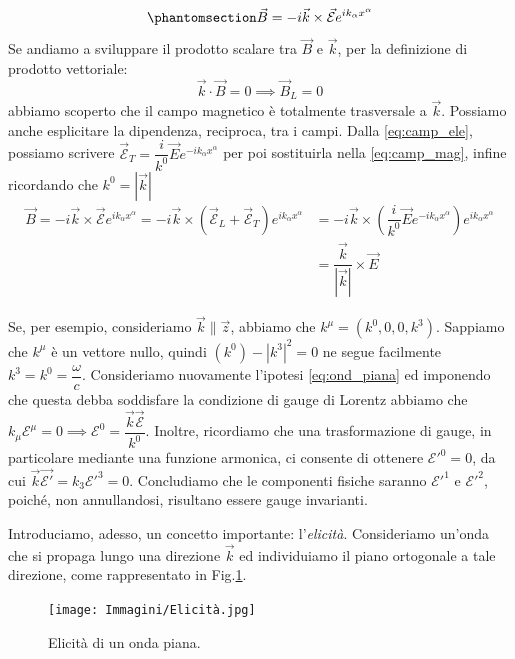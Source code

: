     \begin{equation}\phantomsection\label{eq:camp_mag}
            \Vec{B}=-i\Vec{k}\times\Vec{\mathcal{E}}e^{ik_\alpha x^\alpha}
\end{equation}
Se andiamo a sviluppare il prodotto scalare tra $\Vec{B}$ e $\Vec{k}$, per la definizione di prodotto vettoriale:
\begin{equation}
  \Vec{k}\cdot \Vec{B}=0
  \implies\Vec{B}_L=0
\end{equation}
abbiamo scoperto che il campo magnetico è totalmente trasversale a $\Vec{k}$. Possiamo anche esplicitare la dipendenza, reciproca, tra i campi. Dalla \eqref{eq:camp_ele}, possiamo scrivere $\Vec{\mathcal{E}}_T=\dfrac{i}{k^0}\Vec{E}e^{-ik_\alpha x^\alpha}$ per poi sostituirla nella \eqref{eq:camp_mag}, infine ricordando che $k^0=|\Vec{k}|$
\begin{equation}
\begin{split}
     \Vec{B}=-i\Vec{k}\times\Vec{\mathcal{E}}e^{ik_\alpha x^\alpha}=-i\Vec{k}\times(\Vec{\mathcal{E}}_L+\Vec{\mathcal{E}}_T)e^{ik_\alpha x^\alpha}&=-i\Vec{k}\times(\dfrac{i}{k^0}\Vec{E}e^{-ik_\alpha x^\alpha})e^{ik_\alpha x^\alpha}\\
     &=\dfrac{\Vec{k}}{|\Vec{k}|}\times\Vec{E}
\end{split}
\end{equation}

Se, per esempio, consideriamo $\Vec{k}\parallel\Vec{z}$, abbiamo che $k^\mu=(k^0,0,0,k^3)$. Sappiamo che $k^\mu$ è un vettore nullo, quindi $(k^0)-|k
^3|^2=0$ ne segue facilmente $k^3=k^0=\dfrac{\omega}{c}$. Consideriamo nuovamente l'ipotesi \eqref{eq:ond_piana} ed imponendo che questa debba soddisfare la condizione di gauge di Lorentz abbiamo che $k_\mu\mathcal{E}^\mu=0 \implies \mathcal{E}^0=\dfrac{\Vec{k}\Vec{\mathcal{E}}}{k^0}$. Inoltre, ricordiamo che una trasformazione di gauge, in particolare mediante una funzione armonica, ci consente di ottenere $\mathcal{E'}^0=0$, da cui $\Vec{k}\Vec{\mathcal{E'}}=k_3\mathcal{E'}^3=0$. Concludiamo che le componenti fisiche saranno $\mathcal{E'}^1$ e $\mathcal{E'}^2$, poiché, non annullandosi, risultano essere gauge invarianti.

Introduciamo, adesso, un concetto importante: l'\textit{elicità}. Consideriamo un'onda che si propaga lungo una direzione $\Vec{k}$ ed individuiamo il piano ortogonale a tale direzione, come rappresentato in Fig.\ref{fig:Elicità}.
\begin{figure}[h]
    \centering
    \texttt{[image: Immagini/Elicità.jpg]}
    \caption{ Elicità di un onda piana.}
    \label{fig:Elicità}
\end{figure}

